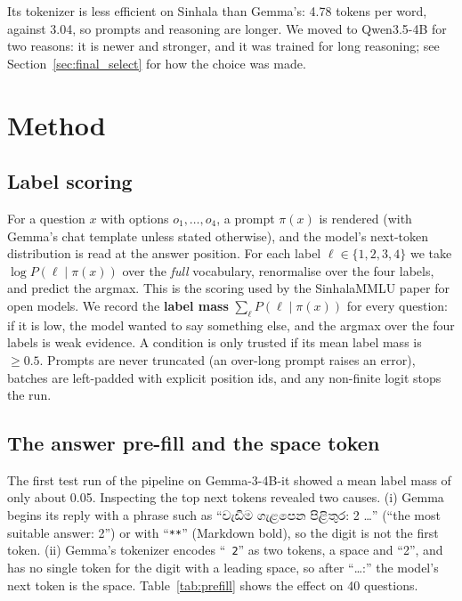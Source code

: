 \documentclass[10pt,a4paper]{article}
\newcommand{\si}[1]{{\sinhalafont #1}}
\begin{document}
Its tokenizer is less efficient on Sinhala than Gemma's: 4.78 tokens per word, against 3.04, so prompts and reasoning
are longer. We moved to Qwen3.5-4B for two reasons: it is newer and stronger, and it was trained for long reasoning;
see Section~\ref{sec:final_select} for how the choice was made.

\section{Method}\label{sec:method}
\subsection{Label scoring}
For a question $x$ with options $o_1,\dots,o_4$, a prompt $\pi(x)$ is rendered (with Gemma's chat template unless
stated otherwise), and the model's next-token distribution is read at the answer position. For each label
$\ell\in\{1,2,3,4\}$ we take $\log P(\ell \mid \pi(x))$ over the \emph{full} vocabulary, renormalise over the four labels,
and predict the argmax. This is the scoring used by the SinhalaMMLU paper for open models. We record the
\textbf{label mass} $\sum_\ell P(\ell\mid\pi(x))$ for every question: if it is low, the model wanted to say
something else, and the argmax over the four labels is weak evidence. A condition is only trusted if its mean label
mass is $\ge 0.5$. Prompts are never truncated (an over-long prompt raises an error), batches are left-padded with
explicit position ids, and any non-finite logit stops the run.

\subsection{The answer pre-fill and the space token}\label{sec:prefill}
The first test run of the pipeline on Gemma-3-4B-it showed a mean label mass of only about 0.05. Inspecting the
top next tokens revealed two causes. (i) Gemma begins its reply with a phrase such as
``\si{වැඩිම ගැළපෙන පිළිතුර}: 2 \ldots'' (``the most suitable answer: 2'') or with ``\texttt{**}'' (Markdown bold), so
the digit is not the first token. (ii) Gemma's tokenizer encodes ``\verb*| 2|'' as two tokens, a space and ``2'',
and has no single token for the digit with a leading space, so after ``\ldots:'' the model's next token is the space.
Table~\ref{tab:prefill} shows the effect on 40 questions.
\end{document}

